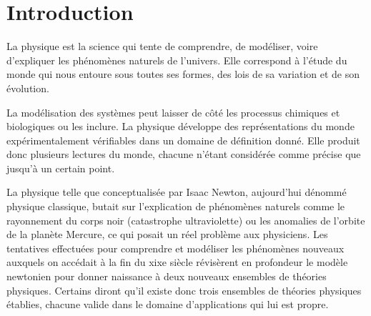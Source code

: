 \documentclass{udes_rapport} %
\begin{document}


\dateRemise{\today}



\newpage

\tableofcontents
\newpage


\listoffigures
\newpage



\section{Introduction}

La physique est la science qui tente de comprendre, de modéliser, voire d'expliquer les phénomènes naturels de l'univers. Elle correspond à l'étude du monde qui nous entoure sous toutes ses formes, des lois de sa variation et de son évolution.

La modélisation des systèmes peut laisser de côté les processus chimiques et biologiques ou les inclure. La physique développe des représentations du monde expérimentalement vérifiables dans un domaine de définition donné. Elle produit donc plusieurs lectures du monde, chacune n'étant considérée comme précise que jusqu'à un certain point.

La physique telle que conceptualisée par Isaac Newton, aujourd’hui dénommé physique classique, butait sur l'explication de phénomènes naturels comme le rayonnement du corps noir (catastrophe ultraviolette) ou les anomalies de l’orbite de la planète Mercure, ce qui posait un réel problème aux physiciens. Les tentatives effectuées pour comprendre et modéliser les phénomènes nouveaux auxquels on accédait à la fin du xixe siècle révisèrent en profondeur le modèle newtonien pour donner naissance à deux nouveaux ensembles de théories physiques. Certains diront qu'il existe donc trois ensembles de théories physiques établies, chacune valide dans le domaine d’applications qui lui est propre.
\end{document}

